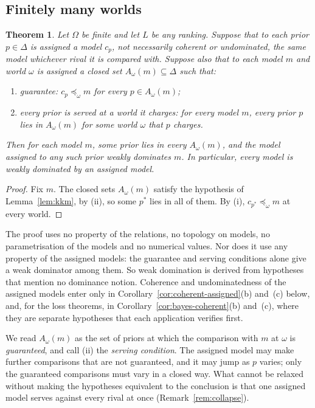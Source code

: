 \documentclass[11pt]{article}
\newtheorem{theorem}{Theorem}[section]
\theoremstyle{definition}
\theoremstyle{remark}
\begin{document}
\subsection{Finitely many worlds}
\begin{theorem}\label{thm:finite}
Let $\Omega$ be finite and let $L$ be any ranking. Suppose that to each prior $p\in\Delta$ is assigned a model $c_p$, not necessarily coherent or undominated, the same model whichever rival it is compared with. Suppose also that to each model $m$ and world $\omega$ is assigned a closed set $A_\omega(m)\subseteq\Delta$ such that:
\begin{enumerate}[label=(\roman*)]
\item \emph{guarantee}: $c_p\preceq_\omega m$ for every $p\in A_\omega(m)$;
\item \emph{every prior is served at a world it charges}: for every model $m$, every prior $p$ lies in $A_\omega(m)$ for some world $\omega$ that $p$ charges.
\end{enumerate}
Then for each model $m$, some prior lies in every $A_\omega(m)$, and the model assigned to any such prior weakly dominates $m$. In particular, every model is weakly dominated by an assigned model.
\end{theorem}
\begin{proof}
Fix $m$. The closed sets $A_\omega(m)$ satisfy the hypothesis of Lemma~\ref{lem:kkm}, by (ii), so some $p^*$ lies in all of them. By (i), $c_{p^*}\preceq_\omega m$ at every world.
\end{proof}

The proof uses no property of the relations, no topology on models, no parametrisation of the models and no numerical values. Nor does it use any property of the assigned models: the guarantee and serving conditions alone give a weak dominator among them. So weak domination is derived from hypotheses that mention no dominance notion. Coherence and undominatedness of the assigned models enter only in Corollary~\ref{cor:coherent-assigned}(b) and~(c) below, and, for the loss theorems, in Corollary~\ref{cor:bayes-coherent}(b) and~(c), where they are separate hypotheses that each application verifies first.

We read $A_\omega(m)$ as the set of priors at which the comparison with $m$ at $\omega$ is \emph{guaranteed}, and call (ii) the \emph{serving condition}. The assigned model may make further comparisons that are not guaranteed, and it may jump as $p$ varies; only the guaranteed comparisons must vary in a closed way. What cannot be relaxed without making the hypotheses equivalent to the conclusion is that one assigned model serves against every rival at once (Remark~\ref{rem:collapse}).
\end{document}
